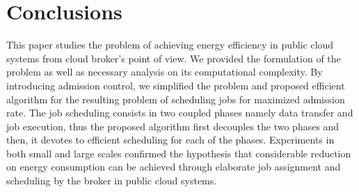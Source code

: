\documentclass{article}
\begin{document}
\section{Conclusions}
\label{sec:conc}

This paper studies the problem of achieving energy efficiency in public cloud systems from cloud broker's point of view. We provided the formulation of the problem as well as necessary analysis on its computational complexity. By introducing admission control, we simplified the problem and proposed efficient algorithm for the resulting problem of scheduling jobs for maximized admission rate. The job scheduling consists in two coupled phases namely data transfer and job execution, thus the proposed algorithm first decouples the two phases and then, it devotes to efficient scheduling for each of the phases. Experiments in both small and large scales confirmed the hypothesis that considerable reduction on energy consumption can be achieved through elaborate job assignment and scheduling by the broker in public cloud systems.

























































  

\balance
\end{document}
